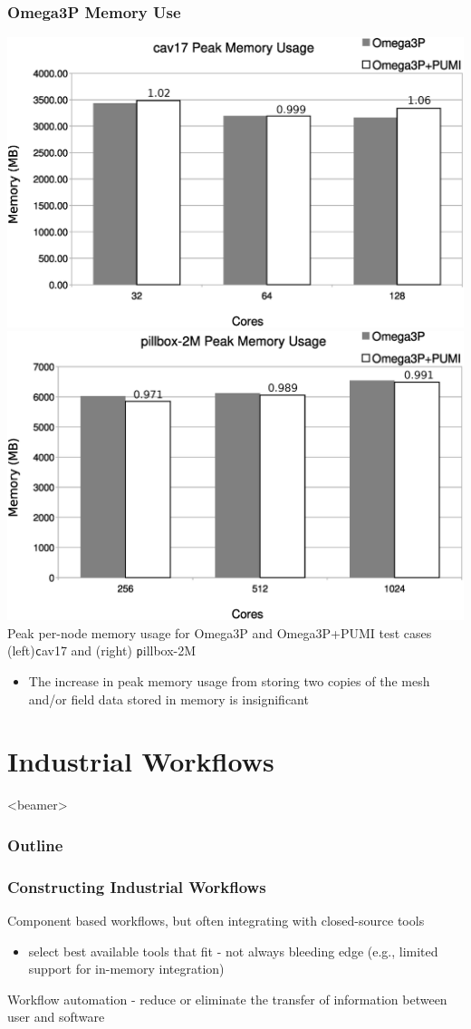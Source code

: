 \documentclass{beamer}
\newcommand{\outline}{
  \begin{frame}<beamer>
    \frametitle{Outline}
    \tableofcontents[currentsection]
  \end{frame}
}
\begin{document}
\begin{frame}
  \frametitle{Omega3P Memory Use}
  {\centering
  \includegraphics[width=.5\textwidth]{../imp/figures/omega3p/cav17-peak-mem.eps}
  \includegraphics[width=.5\textwidth]{../imp/figures/omega3p/pillbox2M-peak-mem.eps}\\
  }
  Peak per-node memory usage for Omega3P and Omega3P+PUMI test cases
  (left){\texttt cav17} and (right) {\texttt pillbox-2M} 
  \begin{itemize}
    \item The increase in peak memory usage from storing two copies of the mesh and/or
      field data stored in memory is insignificant
  \end{itemize}
\end{frame}

\section{Industrial Workflows}
\outline
\begin{frame}
  \frametitle{Constructing Industrial Workflows}
  Component based workflows, but often integrating with closed-source tools
  \begin{itemize}
    \item select best available tools that fit - not always bleeding edge
      (e.g., limited support for in-memory integration)
  \end{itemize}
  \medskip
  Workflow automation - reduce or eliminate the transfer of information 
  between user and software
\end{frame}
\end{document}
